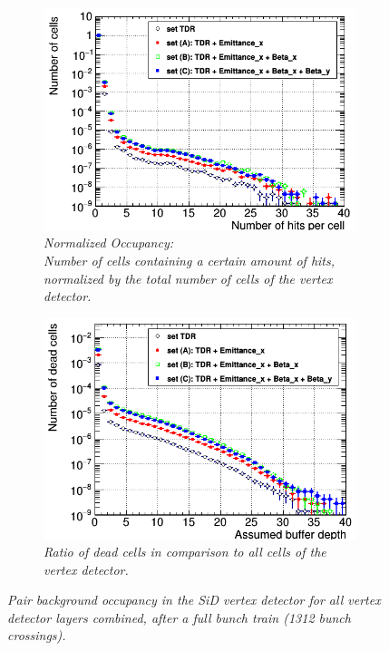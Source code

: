 \begin{figure}[!h]
\centering
\begin{subfigure}[t]{0.45\textwidth}
\centering
\includegraphics[width=1.06\textwidth]{figures/Occupancy_Comparison_All_layers_wrt_cells_ILC250_Comparison_ALL_SETS_5T_w_antiDiD_LEG.png}
\caption{\textit{Normalized Occupancy:\\Number of cells containing a certain amount of hits, normalized by the total number of cells of the vertex detector.}}
\end{subfigure}
\hspace*{0.3cm}
\begin{subfigure}[t]{0.45\textwidth}
\centering
\includegraphics[width=1.05\textwidth]{figures/Occupancy_Comparison_All_layers_deadcells_ILC250_Comparison_ALL_SETS_5T_w_antiDiD_LEG.png}
\caption{\textit{Ratio of dead cells in comparison to all cells of the vertex detector.}}
\end{subfigure}
\caption{\textit{Pair background occupancy in the SiD vertex detector for all vertex detector layers combined, after a full bunch train (1312 bunch crossings).}}
\label{fig:All_layers_Occupancy}
\end{figure}
